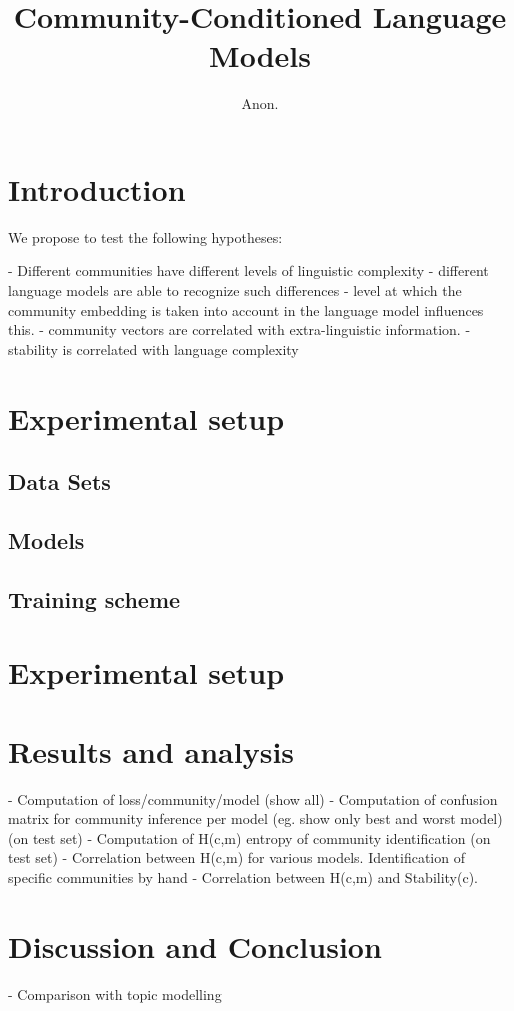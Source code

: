 \documentclass[11pt,a4paper]{article}
\title{Community-Conditioned Language Models}
\author{Anon.}
\date{}
\begin{document}
\maketitle
\begin{abstract}
\end{abstract}


\section{Introduction}

We propose to test the following hypotheses:

 - Different communities have different levels of linguistic complexity
 - different language models are able to recognize such differences
 - level at which the community embedding is taken into account in the language model influences this.
 - community vectors are correlated with extra-linguistic information.
 - stability is correlated with language complexity


 \section{Experimental setup}
 \subsection{Data Sets}
 \subsection{Models}
 \subsection{Training scheme}

 \section{Experimental setup}
 \section{Results and analysis}
 
- Computation of loss/community/model (show all)
- Computation of confusion matrix for community inference per model (eg. show only best and worst model) (on test set)
- Computation of H(c,m) entropy of community identification (on test set)
- Correlation between H(c,m) for various models. Identification of specific communities by hand
- Correlation between H(c,m) and Stability(c).

\section{Discussion and Conclusion}

- Comparison with topic modelling
\end{document}

